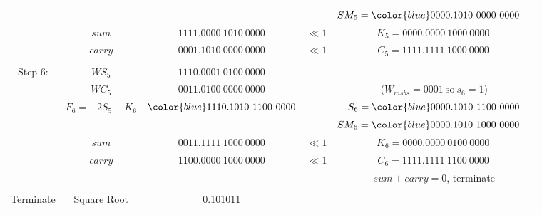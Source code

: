 \documentclass[12pt]{article}
\begin{document}
{\begin{center}
\begin{tabular}{ccccc}
            &                &                                   &          &$SM_5={\color{blue}0000.1010\ 0}000\ 0000\phantom{M}$\\
    \cline{2-3}
            &$sum           $&$         1111.0000\ 1010\ 0000   $&$\ll1    $&$K_5=0000.0000\ 1000\ 0000\ $\\
            &$carry         $&$         0001.1010\ 0000\ 0000   $&$\ll1    $&$C_5=1111.1111\ 1000\ 0000\,$\\
    \hdashline\\
    Step 6: &$WS_5          $&$         1110.0001\ 0100\ 0000   $&          &\\
            &$WC_5          $&$         0011.0100\ 0000\ 0000   $&          &($W_{msbs}=0001\ \text{so}\ s_6=1$)\\
            &$F_6=-2S_5-K_6$&${\color{blue}1110.1010\ 11}00\ 0000$&          &$S_6={\color{blue}0000.1010\ 11}00\ 0000$\\
            &                &                                   &          &$SM_6={\color{blue}0000.1010\ 10}00\ 0000\phantom{M}$\\
    \cline{2-3}
            &$sum           $&$         0011.1111\ 1000\ 0000   $&$\ll1    $&$K_6=0000.0000\ 0100\ 0000\ $\\
            &$carry         $&$         1100.0000\ 1000\ 0000   $&$\ll1    $&$C_6=1111.1111\ 1100\ 0000\,$\\
            &                &                                   &          &$sum+carry=0$, terminate\\
    \hdashline\\
    Terminate&Square Root&0.101011
\end{tabular}
\end{center}
}
\end{document}
